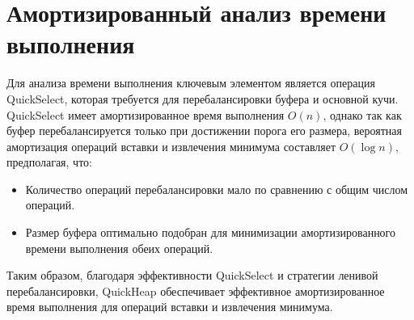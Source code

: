 \section{Амортизированный анализ времени выполнения}

Для анализа времени выполнения ключевым элементом является операция QuickSelect, которая требуется для перебалансировки буфера и основной кучи. QuickSelect имеет амортизированное время выполнения $O(n)$, однако так как буфер перебалансируется только при достижении порога его размера, вероятная амортизация операций вставки и извлечения минимума составляет $O(\log n)$, предполагая, что:

\begin{itemize}
    \item Количество операций перебалансировки мало по сравнению с общим числом операций.
    \item Размер буфера оптимально подобран для минимизации амортизированного времени выполнения обеих операций.
\end{itemize}

Таким образом, благодаря эффективности QuickSelect и стратегии ленивой перебалансировки, QuickHeap обеспечивает эффективное амортизированное время выполнения для операций вставки и извлечения минимума.
